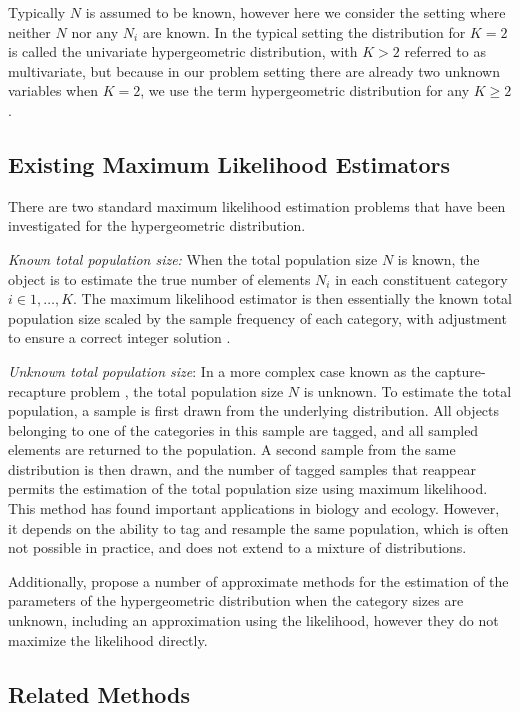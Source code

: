 \documentclass{article}
\theoremstyle{plain}
\theoremstyle{definition}
\theoremstyle{remark}
\begin{document}
Typically $N$ is assumed to be known, however here we consider the setting where neither $N$ nor any $N_i$ are known. In the typical setting the distribution for $K=2$ is called the univariate hypergeometric distribution, with $K>2$ referred to as multivariate, but because in our problem setting there are already two unknown variables when $K=2$, we use the term hypergeometric distribution for any $K \ge 2$.

\subsection{Existing Maximum Likelihood Estimators} 
There are two standard maximum likelihood estimation problems that have been investigated for the hypergeometric distribution.

\textit{Known total population size:} When the total population size $N$ is known, the object is to estimate the true number of elements $N_i$ in each constituent category $i \in 1,\ldots,K$. The maximum likelihood estimator is then essentially the known total population size scaled by the sample frequency of each category, with adjustment to ensure a correct integer solution \citep{oberhofer_maximum_1987}.

\textit{Unknown total population size}: In a more complex case known as the capture-recapture problem \citep{capture-recapture-1958}, the total population size $N$ is unknown. To estimate the total population, a sample is first drawn from the underlying distribution. All objects belonging to one of the categories in this sample are tagged, and all sampled elements are returned to the population. A second sample from the same distribution is then drawn, and the number of tagged samples that reappear permits the estimation of the total population size using maximum likelihood. This method has found important applications in biology and ecology. However, it depends on the ability to tag and resample the same population, which is often not possible in practice, and does not extend to a mixture of distributions.

Additionally, \citet{tohma_estimation_1991} propose a number of approximate methods for the estimation of the parameters of the hypergeometric distribution when the category sizes are unknown, including an approximation using the likelihood, however they do not maximize the likelihood directly.

\subsection{Related Methods}
\end{document}
